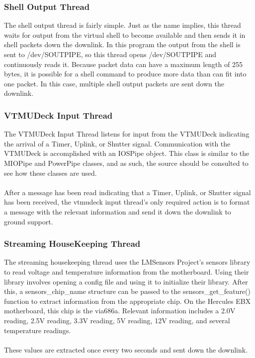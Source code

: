 \subsubsection{Shell Output Thread}

The shell output thread is fairly simple. Just as the name implies, this thread waits for output from the 
virtual shell to become available and then sends it in shell packets down the downlink. In this program the
output from the shell is sent to /dev/SOUTPIPE, so this thread opens /dev/SOUTPIPE and continuously reads
it. Because packet data can have a maximum length of 255 bytes, it is possible for a shell command to 
produce more data than can fit into one packet. In this case, multiple shell output packets are sent
down the downlink.

\subsubsection{VTMUDeck Input Thread}

The VTMUDeck Input Thread listens for input from the VTMUDeck indicating the arrival of a Timer,
Uplink, or Shutter signal. Communication with the VTMUDeck is accomplished with an IOSPipe object.
This class is similar to the MIOPipe and PowerPipe classes, and as such, the source should be
consulted to see how these classes are used.\\
\\
After a message has been read indicating that a Timer, Uplink, or Shutter signal has been received,
the vtmudeck input thread's only required action is to format a message with the relevant information
and send it down the downlink to ground support.

\subsubsection{Streaming HouseKeeping Thread}

The streaming housekeeping thread uses the LMSensors Project's sensors library to read voltage
and temperature information from the motherboard. Using their library involves opening a config
file and using it to initialize their library. After this, a sensors\_chip\_name structure can
be passed to the sensors\_get\_feature() function to extract information from the appropriate
chip. On the Hercules EBX motherboard, this chip is the via686a. Relevant information includes
a 2.0V reading, 2.5V reading, 3.3V reading, 5V reading, 12V reading, and several temperature readings.\\
\\
These values are extracted once every two seconds and sent down the downlink.
